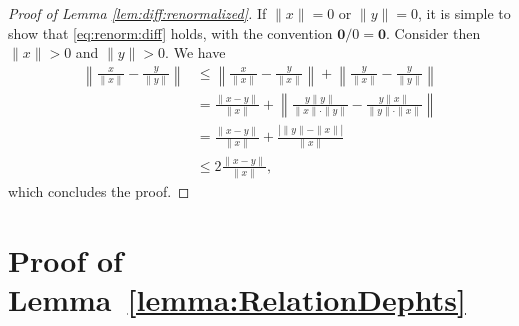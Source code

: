 \documentclass{imsart}
\numberwithin{equation}{section}
\begin{document}
\begin{proof}[Proof of Lemma \ref{lem:diff:renormalized}]
	If $\| x\| =0$ or $\| y\| =0$, it is simple to show that \eqref{eq:renorm:diff} holds, with the convention $\mathbf{0}/0 = \mathbf{0}$.
	Consider then $\| x\| > 0$ and $\| y\|  > 0$.  
	We have
	\begin{align*}
		\left\|  
		\frac{x}{\|x\|}
		-
		\frac{y}{\|y\|}
		\right\|
		&
		\le 
		\left\|  
		\frac{x}{\|x\|}
		-
		\frac{y}{\|x\|}
		\right\|
		+
		\left\|  
		\frac{y}{\|x\|}
		-
		\frac{y}{\|y\|}
		\right\|
		\\ & =
		\frac{\| x-y \|}{\|x\|}
		+
		\left\|  
		\frac{y \| y\|}{\|x\| \cdot \|y\| }
		-
		\frac{y \| x\|}{\|y\| \cdot \|x \|}
		\right\|
		\\ 
		& = 
		\frac{\| x-y \|}{\|x\|}
		+
		\frac{\left| \| y\| - \| x\| \right|}{\|x\|}
		\\ 
		& \le 
		2 \frac{\| x-y \|}{\|x\|},
	\end{align*}
	which concludes the proof.
\end{proof}


\section{Proof of Lemma~\ref{lemma:RelationDephts}}
\end{document}
